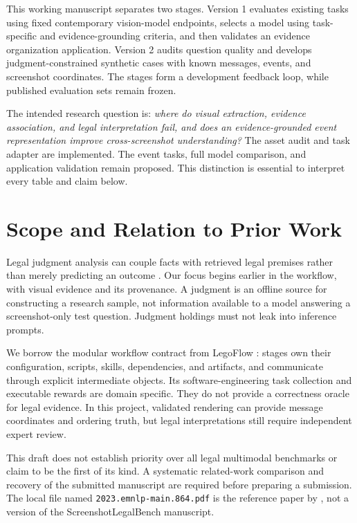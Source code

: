 \documentclass[11pt]{article}
\begin{document}
This working manuscript separates two stages. Version 1 evaluates existing tasks using fixed contemporary vision-model endpoints, selects a model using task-specific and evidence-grounding criteria, and then validates an evidence organization application. Version 2 audits question quality and develops judgment-constrained synthetic cases with known messages, events, and screenshot coordinates. The stages form a development feedback loop, while published evaluation sets remain frozen.

The intended research question is: \emph{where do visual extraction, evidence association, and legal interpretation fail, and does an evidence-grounded event representation improve cross-screenshot understanding?} The asset audit and task adapter are implemented. The event tasks, full model comparison, and application validation remain proposed. This distinction is essential to interpret every table and claim below.

\section{Scope and Relation to Prior Work}
Legal judgment analysis can couple facts with retrieved legal premises rather than merely predicting an outcome \citep{deng2023}. Our focus begins earlier in the workflow, with visual evidence and its provenance. A judgment is an offline source for constructing a research sample, not information available to a model answering a screenshot-only test question. Judgment holdings must not leak into inference prompts.

We borrow the modular workflow contract from LegoFlow \citep{legoflow2026}: stages own their configuration, scripts, skills, dependencies, and artifacts, and communicate through explicit intermediate objects. Its software-engineering task collection and executable rewards are domain specific. They do not provide a correctness oracle for legal evidence. In this project, validated rendering can provide message coordinates and ordering truth, but legal interpretations still require independent expert review.

This draft does not establish priority over all legal multimodal benchmarks or claim to be the first of its kind. A systematic related-work comparison and recovery of the submitted manuscript are required before preparing a submission. The local file named \texttt{2023.emnlp-main.864.pdf} is the reference paper by \citet{deng2023}, not a version of the ScreenshotLegalBench manuscript.
\end{document}
